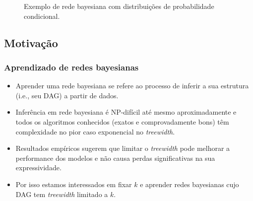 \documentclass{beamer}
\begin{document}
\begin{frame}
\begin{figure}
{
      }

      \caption{Exemplo de rede bayesiana com distribuições de probabilidade condicional.}
      \label{fig:bayes}
    \end{figure}
  \end{frame}

  \subsection{Motivação}

  \begin{frame}
    \frametitle{Aprendizado de redes bayesianas}

    \begin{itemize}
      \item Aprender uma rede bayesiana se refere ao processo de inferir a sua estrutura (i.e., seu DAG) a partir de dados.
      \item Inferência em rede bayesiana é NP-difícil até mesmo aproximadamente e todos os algoritmos conhecidos (exatos e comprovadamente bons) têm complexidade no pior caso exponencial no \emph{treewidth}.
      \item Resultados empíricos sugerem que limitar o \emph{treewidth} pode melhorar a performance dos modelos e não causa perdas significativas na sua expressividade.
      \item Por isso estamos interessados em fixar $k$ e aprender redes bayesianas cujo DAG tem \emph{treewidth} limitado a $k$.
    \end{itemize}
  \end{frame}
\end{document}
